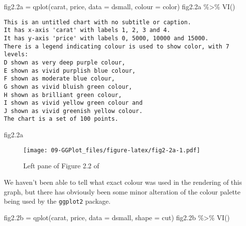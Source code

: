 \documentclass[
]{book}
\newenvironment{Shaded}{\begin{snugshade}}{\end{snugshade}}
\newcommand{\AttributeTok}[1]{\textcolor[rgb]{0.77,0.63,0.00}{#1}}
\newcommand{\FloatTok}[1]{\textcolor[rgb]{0.00,0.00,0.81}{#1}}
\newcommand{\FunctionTok}[1]{\textcolor[rgb]{0.00,0.00,0.00}{#1}}
\newcommand{\NormalTok}[1]{#1}
\newcommand{\OtherTok}[1]{\textcolor[rgb]{0.56,0.35,0.01}{#1}}
\newcommand{\SpecialCharTok}[1]{\textcolor[rgb]{0.00,0.00,0.00}{#1}}
\begin{document}
\begin{Shaded}
\begin{Highlighting}[]
\NormalTok{fig2}\FloatTok{.2}\NormalTok{a }\OtherTok{=} \FunctionTok{qplot}\NormalTok{(carat, price, }\AttributeTok{data =}\NormalTok{ dsmall, }\AttributeTok{colour =}\NormalTok{ color)}
\NormalTok{fig2}\FloatTok{.2}\NormalTok{a }\SpecialCharTok{\%\textgreater{}\%} \FunctionTok{VI}\NormalTok{()   }
\end{Highlighting}
\end{Shaded}

\begin{verbatim}
This is an untitled chart with no subtitle or caption.
It has x-axis 'carat' with labels 1, 2, 3 and 4.
It has y-axis 'price' with labels 0, 5000, 10000 and 15000.
There is a legend indicating colour is used to show color, with 7 levels:
D shown as very deep purple colour, 
E shown as vivid purplish blue colour, 
F shown as moderate blue colour, 
G shown as vivid bluish green colour, 
H shown as brilliant green colour, 
I shown as vivid yellow green colour and 
J shown as vivid greenish yellow colour.
The chart is a set of 100 points.
\end{verbatim}

\begin{Shaded}
\begin{Highlighting}[]
\NormalTok{fig2}\FloatTok{.2}\NormalTok{a}
\end{Highlighting}
\end{Shaded}

\begin{figure}
\centering
\texttt{[image: 09-GGPlot\_files/figure-latex/fig2-2a-1.pdf]}
\caption{\label{fig:fig2-2a}Left pane of Figure 2.2 of \citet{Wickham2009ggplot2}}
\end{figure}

We haven't been able to tell what exact colour was used in the \citet{Wickham2009ggplot2} rendering of this graph, but there has obviously been some minor alteration of the colour palette being used by the \texttt{ggplot2} package.

\begin{Shaded}
\begin{Highlighting}[]
\NormalTok{fig2}\FloatTok{.2}\NormalTok{b }\OtherTok{=} \FunctionTok{qplot}\NormalTok{(carat, price, }\AttributeTok{data =}\NormalTok{ dsmall, }\AttributeTok{shape =}\NormalTok{ cut)    }
\NormalTok{fig2}\FloatTok{.2}\NormalTok{b }\SpecialCharTok{\%\textgreater{}\%} \FunctionTok{VI}\NormalTok{()   }
\end{Highlighting}
\end{Shaded}
\end{document}

